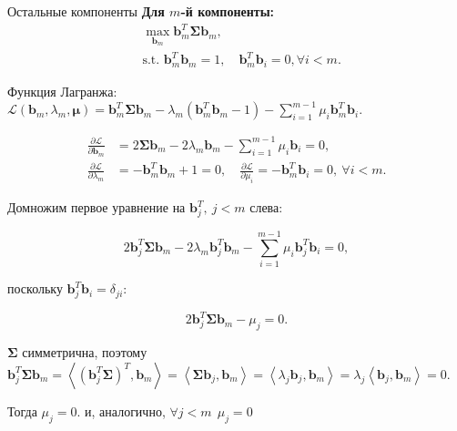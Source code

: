 \begin{frame}[allowframebreaks]{Остальные компоненты}
    \textbf{Для $m$-й компоненты:}
    \begin{align*}
         & \max_{\boldsymbol{b}_m} \boldsymbol{b}_m^T \boldsymbol{\Sigma} \boldsymbol{b}_m,                                    \\
         & \text{s.t. } \boldsymbol{b}_m^T \boldsymbol{b}_m = 1, \quad \boldsymbol{b}_m^T \boldsymbol{b}_i = 0, \forall i < m.
    \end{align*}

    Функция Лагранжа: \(
    \mathcal{L}(\boldsymbol{b}_m, \lambda_m, \boldsymbol{\mu}) = \boldsymbol{b}_m^T\boldsymbol{\Sigma}\boldsymbol{b}_m - \lambda_m(\boldsymbol{b}_m^T\boldsymbol{b}_m - 1) - \sum_{i=1}^{m-1}\mu_i\boldsymbol{b}_m^T\boldsymbol{b}_i.
    \)

    \begin{align*}
        \frac{\partial\mathcal{L}}{\partial\boldsymbol{b}_m} & = 2\boldsymbol{\Sigma}\boldsymbol{b}_m - 2\lambda_m\boldsymbol{b}_m - \sum_{i=1}^{m-1}\mu_i\boldsymbol{b}_i = 0, \\
        \frac{\partial\mathcal{L}}{\partial\lambda_m}        & = -\boldsymbol{b}_m^T\boldsymbol{b}_m + 1 = 0,\quad
        \frac{\partial\mathcal{L}}{\partial\mu_i} = -\boldsymbol{b}_m^T\boldsymbol{b}_i = 0,\:\forall i<m.
    \end{align*}

    Домножим первое уравнение на $\boldsymbol{b}_j^T,\:j<m$ слева:

    $$
        2\boldsymbol{b}_j^T\boldsymbol{\Sigma}\boldsymbol{b}_m - 2\lambda_m\boldsymbol{b}_j^T\boldsymbol{b}_m - \sum_{i=1}^{m-1}\mu_i\boldsymbol{b}_j^T\boldsymbol{b}_i = 0,
    $$

    поскольку $\boldsymbol{b}_j^T\boldsymbol{b}_i = \delta_{ji}$:

    $$
        2\boldsymbol{b}_j^T\boldsymbol{\Sigma}\boldsymbol{b}_m - \mu_j = 0.
    $$

    $\boldsymbol{\Sigma}$ симметрична, поэтому $\boldsymbol{b}_j^T\boldsymbol{\Sigma}\boldsymbol{b}_m = \left\langle (\boldsymbol{b}_j^T\boldsymbol{\Sigma})^T, \boldsymbol{b}_m \right\rangle = \left\langle \boldsymbol{\Sigma}\boldsymbol{b}_j, \boldsymbol{b}_m \right\rangle = \left\langle \lambda_j\boldsymbol{b}_j, \boldsymbol{b}_m \right\rangle = \lambda_j \left\langle \boldsymbol{b}_j, \boldsymbol{b}_m \right\rangle = 0$.

    Тогда $\mu_j = 0.$ и, аналогично, $\forall j<m \:\: \mu_j=0$


\end{frame}
